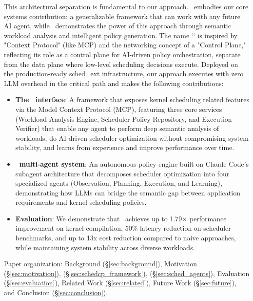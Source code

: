 This architectural separation is fundamental to our approach. \sys\ embodies our core systems contribution: a generalizable framework that can work with any future AI agent, while \agent\ demonstrates the power of this approach through semantic workload analysis and intelligent policy generation. The name `\sys` is inspired by "Context Protocol" (like MCP) and the networking concept of a "Control Plane," reflecting its role as a control plane for AI-driven policy orchestration, separate from the data plane where low-level scheduling decisions execute. Deployed on the production-ready sched\_ext infrastructure, our approach executes with zero LLM overhead in the critical path and makes the following contributions:

\begin{itemize}
    \item \textbf{The \sys\ interface}: A framework that exposes kernel scheduling related features via the Model Context Protocol (MCP), featuring three core services (Workload Analysis Engine, Scheduler Policy Repository, and Execution Verifier) that enable any agent to perform deep semantic analysis of workloads, do AI-driven scheduler optimization without compromising system stability, and learns from experience and improve performance over time.
    \item \textbf{\agent\ multi-agent system}: An autonomous policy engine built on Claude Code's subagent architecture that decomposes scheduler optimization into four specialized agents (Observation, Planning, Execution, and Learning), demonstrating how LLMs can bridge the semantic gap between application requirements and kernel scheduling policies.
    \item \textbf{Evaluation}: We demonstrate that \agent\ achieves up to 1.79× performance improvement on kernel compilation, 50\% latency reduction on scheduler benchmarks, and up to 13x cost reduction compared to naive approaches, while maintaining system stability across diverse workloads.
\end{itemize}

Paper organization: Background (§\ref{sec:background}), Motivation (§\ref{sec:motivation}), \sys (§\ref{sec:schedcp_framework}), \agent (§\ref{sec:sched_agents}), Evaluation (§\ref{sec:evaluation}), Related Work (§\ref{sec:related}), Future Work (§\ref{sec:future}), and Conclusion (§\ref{sec:conclusion}).
